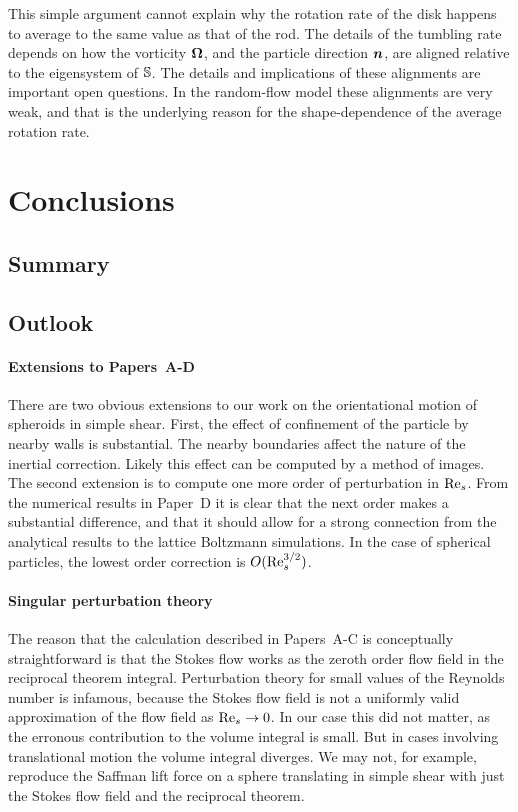 \documentclass[thesis.tex]{subfiles}
\begin{document}
This simple argument cannot explain why the rotation rate of the disk happens to average to the same value as that of the rod. The details of the tumbling rate depends on how the vorticity $\mbox{\boldmath$\Omega$}$, and the particle direction $\mbox{\boldmath$n$}$, are aligned relative to the eigensystem of $\mathbb{S}$. The details and implications of these alignments are important open questions. In the random-flow model these alignments are very weak, and that is the underlying reason for the shape-dependence of the average rotation rate.

\chapter{Conclusions}

\section{Summary}

\section{Outlook}

\subsubsection{Extensions to Papers~A-D}

There are two obvious extensions to our work on the orientational motion of spheroids in simple shear. First, the effect of confinement of the particle by nearby walls is substantial. The nearby boundaries affect the nature of the inertial correction. Likely this effect can be computed by a method of images. The second extension is to compute one more order of perturbation in $\textrm{Re}_s$. From the numerical results in Paper~D it is clear that the next order makes a substantial difference, and that it should allow for a strong connection from the analytical results to the lattice Boltzmann simulations. In the case of spherical particles, the lowest order correction is $O(\textrm{Re}_s^{3/2})$.

\subsubsection{Singular perturbation theory}

The reason that the calculation described in Papers~A-C is conceptually straightforward is that the Stokes flow works as the zeroth order flow field in the reciprocal theorem integral. Perturbation theory for small values of the Reynolds number is infamous, because the Stokes flow field is not a uniformly valid approximation of the flow field as $\textrm{Re}_s\to0$. In our case this did not matter, as the erronous contribution to the volume integral is small. But in cases involving translational motion the volume integral diverges. We may not, for example, reproduce the Saffman lift force on a sphere translating in simple shear with just the Stokes flow field and the reciprocal theorem.
\end{document}
